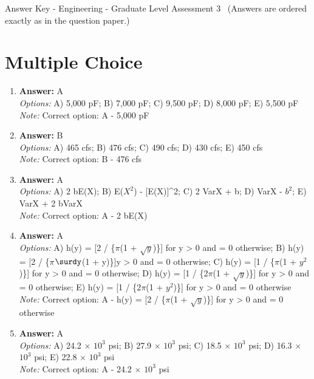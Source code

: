 \documentclass[12pt]{article}
\begin{document}
\begin{center}
Answer Key - Engineering - Graduate Level Assessment 3 \
\small (Answers are ordered exactly as in the question paper.)
\end{center}

\section*{Multiple Choice}
\begin{enumerate}[label=\arabic*.]
\item \textbf{Answer:} A
\\ \textit{Options:} A) 5,000 pF; B) 7,000 pF; C) 9,500 pF; D) 8,000 pF; E) 5,500 pF
\\ \textit{Note:} Correct option: A - 5,000 pF
\item \textbf{Answer:} B
\\ \textit{Options:} A) 465 cfs; B) 476 cfs; C) 490 cfs; D) 430 cfs; E) 450 cfs
\\ \textit{Note:} Correct option: B - 476 cfs
\item \textbf{Answer:} A
\\ \textit{Options:} A) 2 bE(X); B) E($X^2$) - [E(X)]^2; C) 2 VarX + b; D) VarX - $b^2$; E) VarX + 2 bVarX
\\ \textit{Note:} Correct option: A - 2 bE(X)
\item \textbf{Answer:} A
\\ \textit{Options:} A) h(y) = [2 / \{\ensuremath{\pi}(1 + \ensuremath{\sqrt{y}})\}] for y \textgreater{} 0 and = 0 otherwise; B) h(y) = [2 / \{\ensuremath{\pi}\ensuremath{\surdy}(1 + y)\}]y \textgreater{} 0 and = 0 otherwise; C) h(y) = [1 / \{\ensuremath{\pi}(1 + $y^2$)\}] for y \textgreater{} 0 and = 0 otherwise; D) h(y) = [1 / \{2\ensuremath{\pi}(1 + \ensuremath{\sqrt{y}})\}] for y \textgreater{} 0 and = 0 otherwise; E) h(y) = [1 / \{2\ensuremath{\pi}(1 + $y^2$)\}] for y \textgreater{} 0 and = 0 otherwise
\\ \textit{Note:} Correct option: A - h(y) = [2 / \{\ensuremath{\pi}(1 + \ensuremath{\sqrt{y}})\}] for y \textgreater{} 0 and = 0 otherwise
\item \textbf{Answer:} A
\\ \textit{Options:} A) 24.2 \ensuremath{\times} $10^3$ psi; B) 27.9 \ensuremath{\times} $10^3$ psi; C) 18.5 \ensuremath{\times} $10^3$ psi; D) 16.3 \ensuremath{\times} $10^3$ psi; E) 22.8 \ensuremath{\times} $10^3$ psi
\\ \textit{Note:} Correct option: A - 24.2 \ensuremath{\times} $10^3$ psi
\end{enumerate}
\end{document}
